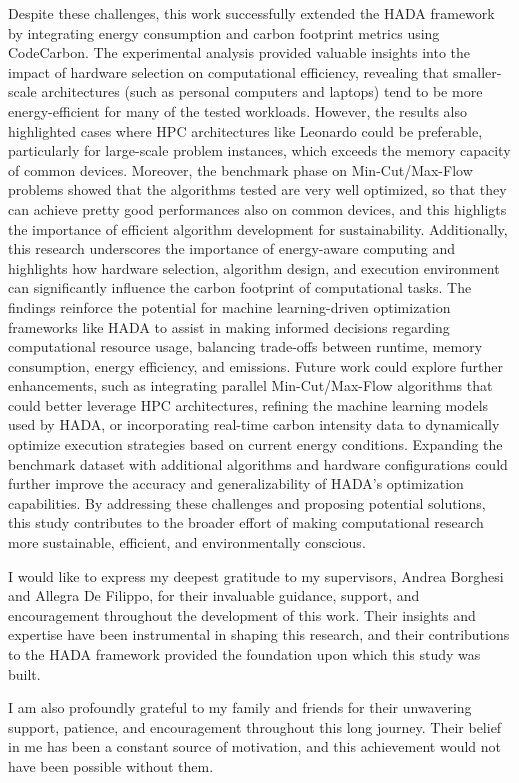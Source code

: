 \documentclass[a4paper,singleside,12pt]{report} %
\begin{document}
Despite these challenges, this work successfully extended the HADA framework by integrating energy consumption and carbon footprint metrics using CodeCarbon. The experimental analysis 
provided valuable insights into the impact of hardware selection on computational efficiency, revealing that smaller-scale architectures (such as personal computers and laptops) tend
to be more energy-efficient for many of the tested workloads. However, the results also highlighted cases where HPC architectures like Leonardo could be preferable, particularly for 
large-scale problem instances, which exceeds the memory capacity of common devices. Moreover, the benchmark phase on Min-Cut/Max-Flow problems showed that the algorithms tested are 
very well optimized, so that they can achieve pretty good performances also on common devices, and this highligts the importance of efficient algorithm development for sustainability.
Additionally, this research underscores the importance of energy-aware computing and highlights how hardware selection, algorithm design, and execution environment can significantly 
influence the carbon footprint of computational tasks. The findings reinforce the potential for machine learning-driven optimization frameworks like HADA to assist in making informed 
decisions regarding computational resource usage, balancing trade-offs between runtime, memory consumption, energy efficiency, and emissions. Future work could explore further enhancements, such as integrating parallel Min-Cut/Max-Flow algorithms that could better leverage HPC architectures, refining the machine learning 
models used by HADA, or incorporating real-time carbon intensity data to dynamically optimize execution strategies based on current energy conditions. Expanding the benchmark dataset 
with additional algorithms and hardware configurations could further improve the accuracy and generalizability of HADA's optimization capabilities.
By addressing these challenges and proposing potential solutions, this study contributes to the broader effort of making computational research more sustainable, efficient, and 
environmentally conscious.

\appendix

\printbibliography[heading=bibintoc] %

\acknowledgements  
I would like to express my deepest gratitude to my supervisors, Andrea Borghesi and Allegra De Filippo, for their invaluable guidance, support, and encouragement throughout 
the development of this work. Their insights and expertise have been instrumental in shaping this research, and their contributions to the HADA framework provided the foundation 
upon which this study was built.  

I am also profoundly grateful to my family and friends for their unwavering support, patience, and encouragement throughout this long journey. Their belief in me has been a 
constant source of motivation, and this achievement would not have been possible without them.  
\end{document}
